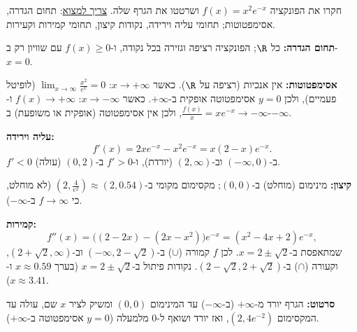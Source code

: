 
\begin{question}
חקרו את הפונקציה $f(x)=x^2e^{-x}$ ושרטטו את הגרף שלה.
\underline{צריך למצוא}: תחום הגדרה, אסימפטוטות; תחומי עליה וירידה, נקודות קיצון, תחומי קמירות וקעירות.
\end{question}

\begin{solution}
\textbf{תחום הגדרה:} כל $\R$; הפונקציה רציפה וגזירה בכל נקודה, ו-$f(x)\ge0$ עם שוויון רק ב-$x=0$.

\textbf{אסימפטוטות:} אין אנכיות (רציפה על $\R$).
כאשר $x\to+\infty$: $\lim_{x\to\infty}\frac{x^2}{e^x}=0$ (לופיטל פעמיים), ולכן $y=0$ אסימפטוטה אופקית ב-$+\infty$.
כאשר $x\to-\infty$: $f(x)\to+\infty$ ו-$\frac{f(x)}{x}=xe^{-x}\to-\infty$, ולכן אין אסימפטוטה (אופקית או משופעת) ב-$-\infty$.

\textbf{עליה וירידה:}
\[
f'(x)=2xe^{-x}-x^2e^{-x}=x(2-x)e^{-x}.
\]
$f'<0$ ב-$(-\infty,0)$ וב-$(2,\infty)$ (יורדת), ו-$f'>0$ ב-$(0,2)$ (עולה).

\textbf{קיצון:} מינימום (מוחלט) ב-$(0,0)$; מקסימום מקומי ב-$\left(2,\frac4{e^2}\right)\approx(2,0.54)$ (לא מוחלט, כי $f\to\infty$ ב-$-\infty$).

\textbf{קמירות:}
\[
f''(x)=\big((2-2x)-(2x-x^2)\big)e^{-x}=(x^2-4x+2)e^{-x},
\]
שמתאפסת ב-$x=2\pm\sqrt2$. לכן $f$ קמורה ($\cup$) ב-$(-\infty,2-\sqrt2)$ וב-$(2+\sqrt2,\infty)$, וקעורה ($\cap$) ב-$(2-\sqrt2,2+\sqrt2)$. נקודות פיתול ב-$x=2\pm\sqrt2$ (בערך $x\approx0.59$ ו-$x\approx3.41$).

\textbf{סרטוט:} הגרף יורד מ-$+\infty$ (ב-$-\infty$) עד המינימום $(0,0)$ ומשיק לציר $x$ שם, עולה עד המקסימום $(2,4e^{-2})$, ואז יורד ושואף ל-$0$ מלמעלה ($y=0$ אסימפטוטה ב-$+\infty$).
\end{solution}
